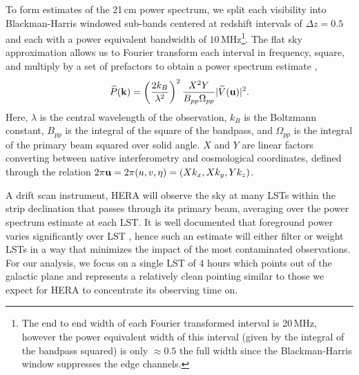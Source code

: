 \documentclass[twocolumn]{emulateapj}
\begin{document}
To form estimates of the 21\,cm power spectrum, we split each visibility into Blackman-Harris windowed sub-bands centered at redshift intervals of $\Delta z = 0.5$ and each with a power equivalent bandwidth of $10$\,MHz\footnote{The end to end width of each Fourier transformed interval is 20\,MHz, however the power equivalent width of this interval (given by the integral of the bandpass squared) is only $\approx 0.5$ the full width since the Blackman-Harris window suppresses the edge channels.}. The flat sky approximation allows us to Fourier transform each interval in frequency, square, and multiply by a set of prefactors to obtain a power spectrum estimate \citep{Parsons:2014},
\begin{equation}\label{eq:PS}
\widehat{P}({\bf k}) = \left( \frac{2 k_B}{\lambda^2} \right)^2 \frac{X^2 Y}{B_{pp} \Omega_{pp}} | \widetilde{V}({\bf u}) |^2.
\end{equation}
Here, $\lambda$ is the central wavelength of the observation, $k_B$ is the Boltzmann constant, $B_{pp}$ is the integral of the square of the bandpass, and $\Omega_{pp}$ is the integral of the primary beam squared over solid angle. $X$ and $Y$ are linear factors converting between native interferometry and cosmological coordinates, defined through the relation $2 \pi {\bf u}=2 \pi (u,v,\eta) = (X k_x, X k_y, Y k_z)$. 

A drift scan instrument, HERA will observe the sky at many LSTs within the strip declination that passes through its primary beam, averaging over the power spectrum estimate at each LST. It is well documented that foreground power varies significantly over LST \citep{Thyagarajan:2015a}, hence such an estimate will either filter or weight LSTs in a way that minimizes the impact of the most contaminated observations. For our analysis, we focus on a single LST of 4 hours which points out of the galactic plane and represents a relatively clean pointing similar to those we expect for HERA to concentrate its observing time on.  
\end{document}

